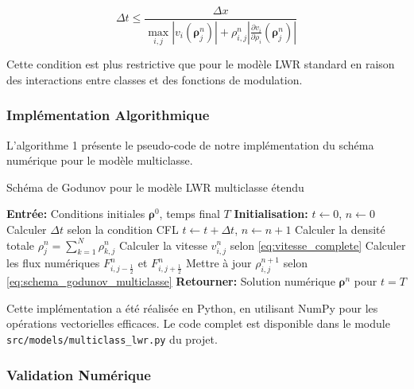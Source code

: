 \begin{equation}
\Delta t \leq \frac{\Delta x}{\max_{i,j} |v_i(\boldsymbol{\rho}^n_j)| + \rho_{i,j}^n\left|\frac{\partial v_i}{\partial \rho_i}(\boldsymbol{\rho}^n_j)\right|}
\end{equation}

Cette condition est plus restrictive que pour le modèle LWR standard en raison des interactions entre classes et des fonctions de modulation.

\subsubsection{Implémentation Algorithmique}
\label{subsubsec:implementation_algorithmique}

L'algorithme 1 présente le pseudo-code de notre implémentation du schéma numérique pour le modèle multiclasse.

\begin{algorithm}
\caption{Schéma de Godunov pour le modèle LWR multiclasse étendu}
\begin{algorithmic}[1]
\State \textbf{Entrée:} Conditions initiales $\boldsymbol{\rho}^0$, temps final $T$
\State \textbf{Initialisation:} $t \gets 0$, $n \gets 0$
    \State Calculer $\Delta t$ selon la condition CFL
    \State $t \gets t + \Delta t$, $n \gets n + 1$
            \State Calculer la densité totale $\rho_j^n = \sum_{k=1}^N \rho_{k,j}^n$
            \State Calculer la vitesse $v_{i,j}^n$ selon \eqref{eq:vitesse_complete}
            \State Calculer les flux numériques $F_{i,j-\frac{1}{2}}^n$ et $F_{i,j+\frac{1}{2}}^n$
            \State Mettre à jour $\rho_{i,j}^{n+1}$ selon \eqref{eq:schema_godunov_multiclasse}
        \EndFor
    \EndFor
\EndWhile
\State \textbf{Retourner:} Solution numérique $\boldsymbol{\rho}^n$ pour $t = T$
\end{algorithmic}
\end{algorithm}

Cette implémentation a été réalisée en Python, en utilisant NumPy pour les opérations vectorielles efficaces. Le code complet est disponible dans le module \texttt{src/models/multiclass\_lwr.py} du projet.

\subsubsection{Validation Numérique}
\label{subsubsec:validation_numerique}

